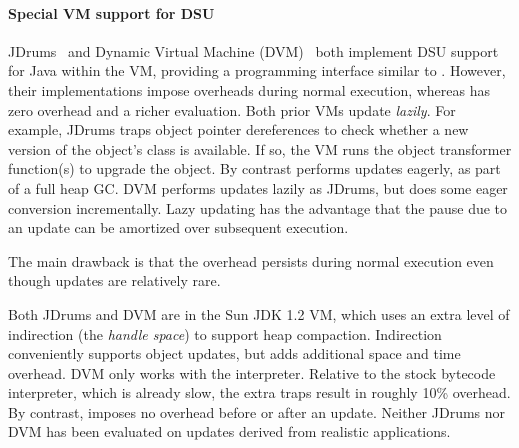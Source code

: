 
\paragraph{Special VM support for DSU}

JDrums~\cite{ritzau00dynamic} and Dynamic Virtual Machine
(DVM)~\cite{Mala00a} both implement DSU support for Java within the
VM, providing a programming
interface similar to \DSU.  However, their implementations impose
overheads during normal execution, whereas \DSU{} has zero overhead
and a richer evaluation.
Both prior VMs update \emph{lazily}.  For example, JDrums traps object
pointer dereferences to check whether a new version of the object's
class is available. If so, the VM runs the object transformer
function(s) to upgrade the object.  By contrast \DSU{} performs
updates eagerly, as part of a full heap GC\@. DVM performs updates
lazily as JDrums, but does some eager conversion incrementally.  Lazy
updating has the advantage that the pause due to an update can be
amortized over subsequent execution.

The main drawback is that the overhead persists during normal execution
even though updates are relatively rare. 

Both JDrums and DVM are in the Sun JDK 1.2 VM, which uses an extra
level of indirection (the \emph{handle space}) to support heap
compaction.  Indirection conveniently supports object updates, but
adds additional space and time overhead.  DVM only works with the interpreter.
Relative to the stock bytecode interpreter, which is already slow, the
extra traps result in roughly 10\% overhead.  By contrast, \DSU{}
imposes no overhead before or after an update.  Neither JDrums nor
DVM has been evaluated on updates derived from realistic
applications. %



